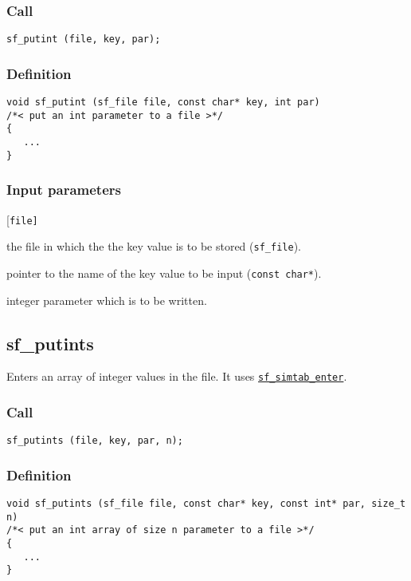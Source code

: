\subsubsection*{Call}
\begin{verbatim}sf_putint (file, key, par);\end{verbatim}

\subsubsection*{Definition}
\begin{verbatim}
void sf_putint (sf_file file, const char* key, int par)
/*< put an int parameter to a file >*/
{
   ...
}
\end{verbatim}

\subsubsection*{Input parameters}
\begin{desclist}{\tt }{\quad}[\tt file]
   \setlength\itemsep{0pt}
   \item[file] the file in which the the key value is to be stored (\texttt{sf\_file}).
   \item[key]  pointer to the name of the key value to be input (\texttt{const char*}).
   \item[par]  integer parameter which is to be written.
\end{desclist}




\subsection{{sf\_putints}}
Enters an array of integer values in the file. It uses \hyperref[sec:sf_simtab_enter]{\texttt{sf\_simtab\_enter}}.  

\subsubsection*{Call}
\begin{verbatim}sf_putints (file, key, par, n);\end{verbatim}

\subsubsection*{Definition}
\begin{verbatim}
void sf_putints (sf_file file, const char* key, const int* par, size_t n)
/*< put an int array of size n parameter to a file >*/
{
   ...
}
\end{verbatim}

